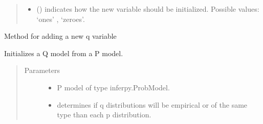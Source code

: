 \documentclass[letterpaper,10pt,english]{sphinxmanual}
\begin{document}
\begin{fulllineitems}
\begin{fulllineitems}
\begin{quote}
\begin{description}
\begin{itemize}
\item {} 
 () \textendash{} indicates how the new variable should be initialized. Possible values: ‘ones’ , ‘zeroes’.

\end{itemize}

\end{description}\end{quote}

\end{fulllineitems}


\begin{fulllineitems}
\label{\detokenize{modules/inferpy.inferences:inferpy.inferences.qmodel.Qmodel.__init__}}
\end{fulllineitems}


\begin{fulllineitems}
\label{\detokenize{modules/inferpy.inferences:inferpy.inferences.qmodel.Qmodel.add_var}}
Method for adding a new q variable

\end{fulllineitems}


\begin{fulllineitems}
\label{\detokenize{modules/inferpy.inferences:inferpy.inferences.qmodel.Qmodel.build_from_pmodel}}
Initializes a Q model from a P model.
\begin{quote}\begin{description}
\item[{Parameters}] \leavevmode\begin{itemize}
\item {} 
 \textendash{} P model of type inferpy.ProbModel.

\item {} 
 \textendash{} determines if q distributions will be empirical or of the same type than each p distribution.


\end{itemize}
\end{description}
\end{quote}
\end{fulllineitems}
\end{fulllineitems}
\end{document}
